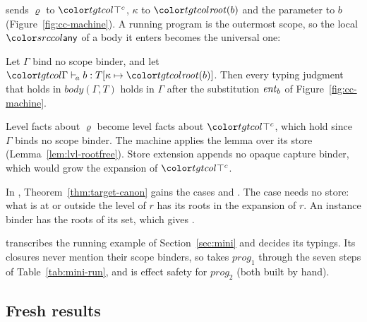  sends $\varrho$ to $\topc$, $\kappa$ to $\rt{b}$ and the parameter to $b$ (Figure~\ref{fig:cc-machine}). A running program is the outermost scope, so the local $\cany$ of a body it enters becomes the universal one:

\begin{lemma}\label{lem:lvl-enter}
Let $\Gamma$ bind no scope binder, and let $\atomj{\Gamma}{b}{T[\kappa \mapsto \rt{b}]}$. Then every typing judgment that holds in $\mathit{body}(\Gamma, T)$ holds in $\Gamma$ after the substitution $\mathit{ent}_{b}$ of Figure~\ref{fig:cc-machine}.
\end{lemma}

Level facts about $\varrho$ become level facts about $\topc$, which hold since $\Gamma$ binds no scope binder. The machine applies the lemma over its store (Lemma~\ref{lem:lvl-rootfree}). Store extension appends no opaque capture binder, which would grow the expansion of $\topc$.

In \treeCC, Theorem~\ref{thm:target-canon} gains the cases  and . The  case needs no store: what is at or outside the level of $r$ has its roots in the expansion of $r$. An instance binder has the roots of its set, which gives .

\treeCC transcribes the running example of Section~\ref{sec:mini} and decides its typings. Its closures never mention their scope binders, so  takes $\mathit{prog}_1$ through the seven steps of Table~\ref{tab:mini-run}, and  is effect safety for $\mathit{prog}_2$ (both built by hand).

\subsection{Fresh results}\label{sec:levels-fresh}

